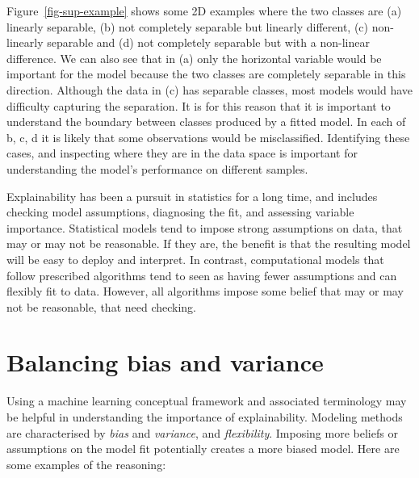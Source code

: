 \documentclass[
  letterpaper,
]{krantz}
\begin{document}
Figure~\ref{fig-sup-example} shows some 2D examples where the two
classes are (a) linearly separable, (b) not completely separable but
linearly different, (c) non-linearly separable and (d) not completely
separable but with a non-linear difference. We can also see that in (a)
only the horizontal variable would be important for the model because
the two classes are completely separable in this direction. Although the
data in (c) has separable classes, most models would have difficulty
capturing the separation. It is for this reason that it is important to
understand the boundary between classes produced by a fitted model. In
each of b, c, d it is likely that some observations would be
misclassified. Identifying these cases, and inspecting where they are in
the data space is important for understanding the model's performance on
different samples.

Explainability has been a pursuit in statistics for a long time, and
includes checking model assumptions, diagnosing the fit, and assessing
variable importance. Statistical models tend to impose strong
assumptions on data, that may or may not be reasonable. If they are, the
benefit is that the resulting model will be easy to deploy and
interpret. In contrast, computational models that follow prescribed
algorithms tend to seen as having fewer assumptions and can flexibly fit
to data. However, all algorithms impose some belief that may or may not
be reasonable, that need checking.

\section{Balancing bias and variance}\label{balancing-bias-and-variance}

Using a machine learning conceptual framework and associated terminology
may be helpful in understanding the importance of explainability.
Modeling methods are characterised by \emph{bias} and \emph{variance},
and \emph{flexibility}. Imposing more beliefs or assumptions on the
model fit potentially creates a more biased model. Here are some
examples of the reasoning:
\end{document}
